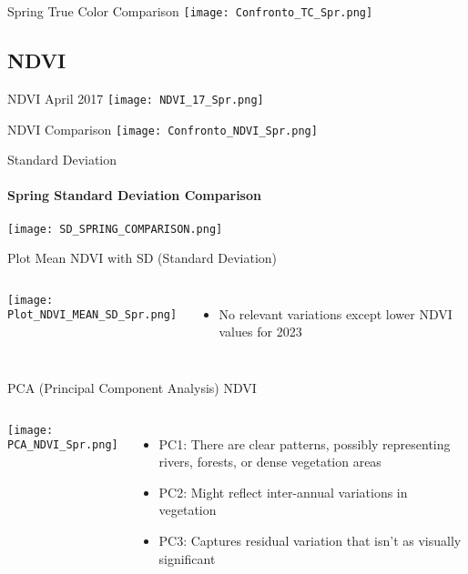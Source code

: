 \documentclass[10pt]{beamer}
\begin{document}
\begin{frame}{Spring True Color Comparison}
    \centering
    \texttt{[image: Confronto\_TC\_Spr.png]}  
\end{frame}

\subsection{NDVI}
\begin{frame}{NDVI April 2017}
    \centering
    \texttt{[image: NDVI\_17\_Spr.png]}  
    
\end{frame}

\begin{frame}{NDVI Comparison}
    \centering
    \texttt{[image: Confronto\_NDVI\_Spr.png]}
\end{frame}

\begin{frame}{Standard Deviation}
\framesubtitle{Spring Standard Deviation Comparison}
    \centering
    \texttt{[image: SD\_SPRING\_COMPARISON.png]}
\end{frame}


\begin{frame}{Plot Mean NDVI with SD (Standard Deviation)}
    \begin{columns}
                \texttt{[image: Plot\_NDVI\_MEAN\_SD\_Spr.png]}
            \begin{itemize}
                \item<1->No relevant variations except lower NDVI values for 2023
            \end{itemize}
    \end{columns}
    
\end{frame}

\begin{frame}{PCA (Principal Component Analysis) NDVI}
    \begin{columns}
            \texttt{[image: PCA\_NDVI\_Spr.png]}

            \begin{itemize}
                \item PC1: There are clear patterns, possibly representing rivers, forests, or dense vegetation areas 
                \item PC2: Might reflect inter-annual variations in vegetation
                \item PC3: Captures residual variation that isn’t as visually significant
            \end{itemize}
    \end{columns}
    
\end{frame}
\end{document}
